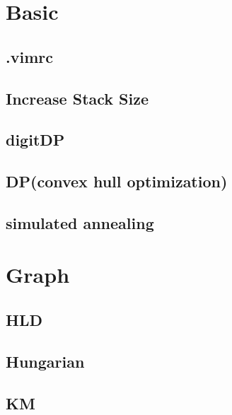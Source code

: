 \documentclass[10pt,twocolumn,oneside]{article}
\begin{document}
\pagestyle{fancy}
\fancyfoot{}
\fancyhead[R]{\thepage}
\renewcommand{\headrulewidth}{0.4pt}
\renewcommand{\contentsname}{Contents}


\tableofcontents

\newpage

\section{Basic}
\subsection{.vimrc}

\subsection{Increase Stack Size}

\subsection{digitDP}

\subsection{DP(convex hull optimization)}

\subsection{simulated annealing}



\section{Graph}
\subsection{HLD}

\subsection{Hungarian}

\subsection{KM}

\end{document}

